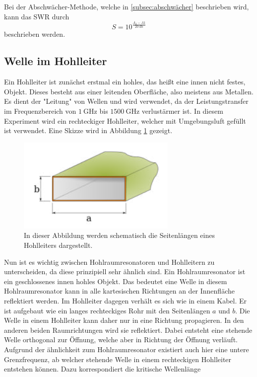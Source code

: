 Bei der Abschwächer-Methode, welche in \autoref{subsec:abschwächer} beschrieben wird, kann das SWR durch 
\begin{equation}
              \label{eqn:S_abschwaecher}
              S = 10^\frac{A_2-A1}{\qty{20}{\decibel}}
\end{equation}
beschrieben werden.
\subsection{Welle im Hohlleiter}
\label{subsec:hohlleiter}
Ein Hohlleiter ist zunächst erstmal ein hohles, das heißt eine innen nicht festes, Objekt. Dieses besteht aus einer leitenden Oberfläche, also meistens aus Metallen. Es dient der 
"Leitung" von Wellen und wird verwendet, da der Leistungstransfer im Frequenzbereich von $\qty{1}{\giga\hertz}$ bis $\qty{1500}{\giga\hertz}$ verlustärmer ist. In diesem Experiment
wird ein rechteckiger Hohlleiter, welcher mit Umgebungsluft gefüllt ist verwendet. Eine Skizze wird in Abbildung \ref{fig:hohlleiter} gezeigt.

\begin{figure}
              \centering
              \includegraphics{content/hohlleiter.PNG}
              \caption{In dieser Abbildung werden schematisch die Seitenlängen eines Hohlleiters dargestellt.}
              \label{fig:hohlleiter}
\end{figure}

Nun ist es wichtig zwischen Hohlraumresonatoren und Hohlleitern zu unterscheiden, da diese 
prinzipiell sehr ähnlich sind. Ein Hohlraumresonator ist ein geschlossenes innen hohles Objekt. Das bedeutet eine Welle in diesem Hohlraumresonator kann in alle kartesischen Richtungen
an der Innenfläche reflektiert werden. Im Hohlleiter dagegen verhält es sich wie in einem Kabel. Er ist aufgebaut wie ein langes rechteckiges Rohr mit den Seitenlängen $a$ und $b$. Die 
Welle in einem Hohlleiter kann daher nur in eine Richtung propagieren. In den anderen beiden Raumrichtungen wird sie reflektiert. Dabei entsteht eine stehende Welle orthogonal zur 
Öffnung, welche aber in Richtung der Öffnung verläuft. Aufgrund der ähnlichkeit zum Hohlraumresonator existiert auch hier eine untere Grenzfrequenz, ab welcher stehende Welle 
in einem rechteckigen Hohlleiter entstehen können. Dazu korrespondiert die kritische Wellenlänge 

